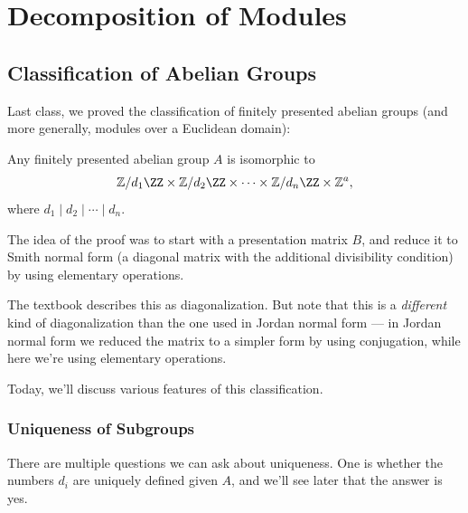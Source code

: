 


\section{Decomposition of Modules}

\subsection{Classification of Abelian Groups}

Last class, we proved the classification of finitely presented abelian groups (and more generally, modules over a Euclidean domain):
\begin{theorem}
Any finitely presented abelian group $A$ is isomorphic to \[\mathbb{Z}/d_1\ZZ \times \mathbb{Z}/d_2\ZZ \times \cdots \times \mathbb{Z}/d_n\ZZ \times \mathbb{Z}^a,\] where $d_1 \mid d_2 \mid \cdots \mid d_n$. 
\end{theorem}
The idea of the proof was to start with a presentation matrix $B$, and reduce it to Smith normal form (a diagonal matrix with the additional divisibility condition) by using elementary operations. 

\begin{note}
The textbook describes this as diagonalization. But note that this is a \emph{different} kind of diagonalization than the one used in Jordan normal form --- in Jordan normal form we reduced the matrix to a simpler form by using conjugation, while here we're using elementary operations. 
\end{note}

Today, we'll discuss various features of this classification. 

\subsubsection{Uniqueness of Subgroups}

There are multiple questions we can ask about uniqueness. One is whether the numbers $d_i$ are uniquely defined given $A$, and we'll see later that the answer is yes. 

